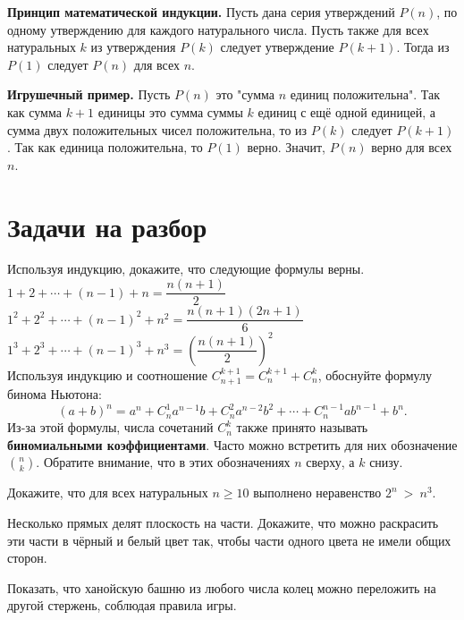 \documentclass[a4paper,12pt]{article}
\begin{document}
    
    {\bf Принцип математической индукции.} Пусть дана серия утверждений $P(n)$, по одному утверждению для каждого натурального числа. Пусть также для всех натуральных $k$ из утверждения $P(k)$ следует утверждение $P(k + 1)$. Тогда из $P(1)$ следует $P(n)$ для всех $n$.
    
    {\bf Игрушечный пример.} Пусть $P(n)$ это "сумма $n$ единиц положительна". Так как сумма $k + 1$ единицы это сумма суммы $k$ единиц с ещё одной единицей, а сумма двух положительных чисел положительна, то из $P(k)$ следует $P(k + 1)$. Так как единица положительна, то $P(1)$ верно. Значит, $P(n)$ верно для всех $n$. 
    
    \section{Задачи на разбор}
    
    \problem Используя индукцию, докажите, что следующие формулы верны.\\
    \sub $1 + 2 + \cdots + (n - 1) + n = \dfrac{n(n + 1)}{2}$\\
    \sub $1^2 + 2^2 + \cdots + (n - 1)^2 + n^2 = \dfrac{n(n + 1)(2n + 1)}{6}$\\
    \sub $1^3 + 2^3 + \cdots + (n - 1)^3 + n^3 = \left(\dfrac{n(n + 1)}{2}\right)^2$\\
    
    \problem Используя индукцию и соотношение $C_{n + 1}^{k + 1} = C_{n}^{k + 1} + C_{n}^{k}$, обоснуйте формулу бинома Ньютона:
    \begin{equation*}
        (a + b)^n = a^n + C_n^1 a^{n-1} b + C_n^2 a^{n-2} b^2 + \cdots + C_n^{n-1} a b^{n-1} +  b^n.
    \end{equation*}
    Из-за этой формулы, числа сочетаний $C_n^k$ также принято называть \textbf{биномиальными коэффициентами}. Часто можно встретить для них обозначение $\binom{n}{k}$. Обратите внимание, что в этих обозначениях $n$ сверху, а $k$ снизу.
    
    \problem Докажите, что для всех натуральных $n \geq 10$ выполнено неравенство $2^n~>~n^3$.
    
    \problem Несколько прямых делят плоскость на части. Докажите, что можно раскрасить эти части в чёрный и белый цвет так, чтобы части одного цвета не имели общих сторон.
    
    \problem Показать, что ханойскую башню из любого числа колец можно переложить на другой стержень, соблюдая правила игры.
    
\end{document}
